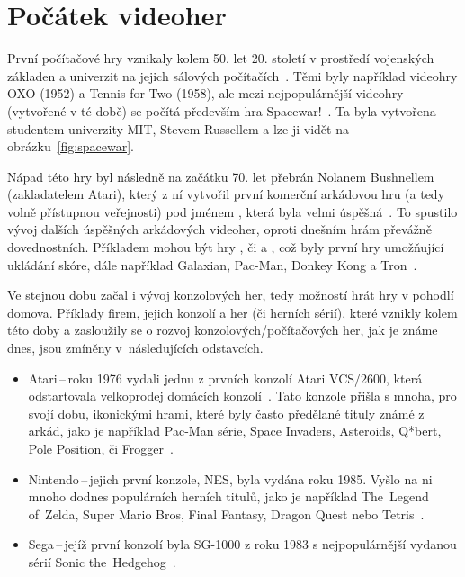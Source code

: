 \section{Počátek videoher}
První počítačové hry vznikaly kolem 50. let 20. století v prostředí vojenských základen a univerzit na jejich sálových počítačích~\cite{novak2011game}. Těmi byly například videohry OXO (1952) a Tennis for Two (1958), ale mezi nejpopulárnější videohry (vytvořené v té době) se počítá především hra Spacewar!~\cite{bellis2019spacewar}. Ta byla vytvořena studentem univerzity MIT, Stevem Russellem a lze ji vidět na obrázku~\ref{fig:spacewar}. 


Nápad této hry byl následně na začátku 70. let přebrán Nolanem Bushnellem (zakladatelem Atari), který z ní vytvořil první komerční arkádovou hru (a tedy volně přístupnou veřejnosti) pod jménem , která byla velmi úspěšná~\cite{video_games_history}. To spustilo vývoj dalších úspěšných arkádových videoher, oproti dnešním hrám převážně dovednostních. Příkladem mohou být hry , či  a , což byly první hry umožňující ukládání skóre, dále například Galaxian, Pac-Man, Donkey Kong a Tron~\cite{novak2011game}.

Ve stejnou dobu začal i vývoj konzolových her, tedy možností hrát hry v pohodlí domova. Příklady firem, jejich konzolí a her (či herních sérií), které vznikly kolem této doby a zasloužily se o rozvoj konzolových/počítačových her, jak je známe dnes, jsou zmíněny v~následujících odstavcích.
\begin{itemize}
    \item Atari\,--\,roku 1976 vydali jednu z prvních konzolí Atari VCS/2600, která odstartovala velkoprodej domácích konzolí~\cite{novak2011game}. Tato konzole přišla s mnoha, pro svojí dobu, ikonickými hrami, které byly často předělané tituly známé z arkád, jako je například Pac-Man série, Space Invaders, Asteroids, Q*bert, Pole Position, či Frogger~\cite{Atari_games}.
    \item Nintendo\,--\,jejich první konzole, NES, byla vydána roku 1985. Vyšlo na ni mnoho dodnes populárních herních titulů, jako je například The~Legend of~Zelda, Super Mario Bros, Final Fantasy, Dragon Quest nebo Tetris~\cite{NES_GAMES}.
    \item Sega\,--\,jejíž první konzolí byla SG-1000 z roku 1983 s nejpopulárnější vydanou sérií Sonic the~Hedgehog~\cite{SegaRetro_2023}.
\end{itemize}

